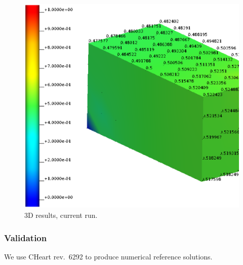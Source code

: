 %
\begin{figure}[h!]
    \centering 
    \includegraphics[width=0.9\columnwidth]{examples/example-0001/doc/figures/current_run_l2x1x1_n8x4x4_i1_s0.eps} 
    \caption{3D results, current run.}
    \label{example-0001-current-run-3D-fig}
\end{figure}
%
%
\subsubsection{Validation}
%
We use CHeart rev.\ 6292 to produce numerical reference solutions.
%
